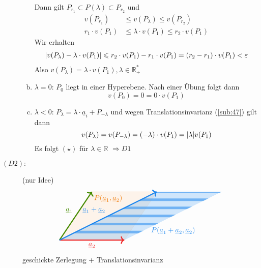 \begin{description}
\begin{enumerate}[a)]
		Dann gilt $P_{r_1} \subset P(\lambda ) \subset P_{r_2}$ und 
		\begin{align*}
			v(P_{r_1}) &\le v(P_{\lambda }) \le v(P_{r_2}) \tag*{und}\\
			r_1 \cdot v(P_1) &\le \lambda  \cdot v(P_1) \le r_2 \cdot v(P_1)
		\end{align*}
		Wir erhalten 
		\begin{align*}
			\abs*{v(P_\lambda )- \lambda \cdot v(P_1)} \le r_2 \cdot v(P_1) - r_1 \cdot v(P_1) = (r_2-r_1)\cdot  v(P_1) < \varepsilon
		\end{align*}
		Also $v(P_\lambda )= \lambda  \cdot v(P_1), \lambda  \in \mathds{R}_+^*$
		\item $\lambda =0$: $P_0$ liegt in einer Hyperebene. Nach einer Übung folgt dann
		\[
			v(P_0)=0 = 0 \cdot v(P_1)
		\]
		\item $\lambda < 0$: $P_\lambda = \lambda  \cdot \underline{a}_i + P_{-\lambda }$ und wegen Translationsinvarianz (\ref{sub:47}) gilt dann
		\[
			v(P_\lambda ) = v(P_{-\lambda }) =(-\lambda) \cdot v(P_1) = \abs*{\lambda } v(P_1) 
		\]
		Es folgt $(\star)$ für $\lambda \in \mathds{R}$ $\Rightarrow D1$
	\end{enumerate}
	\item[$(D2):$] (nur Idee)\\
	\[
		\begin{tikzpicture}[scale=0.8]
			\draw[DarkOrange2!20, fill=DarkOrange2!20, fill opacity=0.4] (0,0)--(4,0)--(6,3)--(2,3)-- cycle;
			\node[DarkOrange2] at (3,2.6) {$P(\underline{a}_1, \underline{a}_2)$};
			\begin{scope}%
			  \clip[postaction={ultra thick, DodgerBlue2,fill=DodgerBlue2,fill opacity=0.2},](0,0)--(4,0)--(10,3)--(6,3)-- cycle;
			  \foreach \x in {0.5,1,1.5,2,2.5,...,4}%
			           \draw[DodgerBlue2!80,line width=1.3mm, opacity=0.7](0,\x)--(10,\x);
			\end{scope}
			\node[DodgerBlue2] at (7,0.6) {$P(\underline{a}_1+ \underline{a}_2, \underline{a}_2)$};
			\draw[->, ultra thick, Firebrick2] (0,0) --(4,0) node[midway, below]{$\underline{a}_2$};
			\draw[->, ultra thick, Chartreuse4] (0,0)--(2,3) node[midway, above left]{$\underline{a}_1$};
			\draw[->, ultra thick, DodgerBlue2] (0,0)-- (6,3) node[midway, above left]{$\underline{a}_1 + \underline{a}_2$};
			
		\end{tikzpicture}
	\]
	geschickte Zerlegung + Translationsinvarianz
\end{description}

